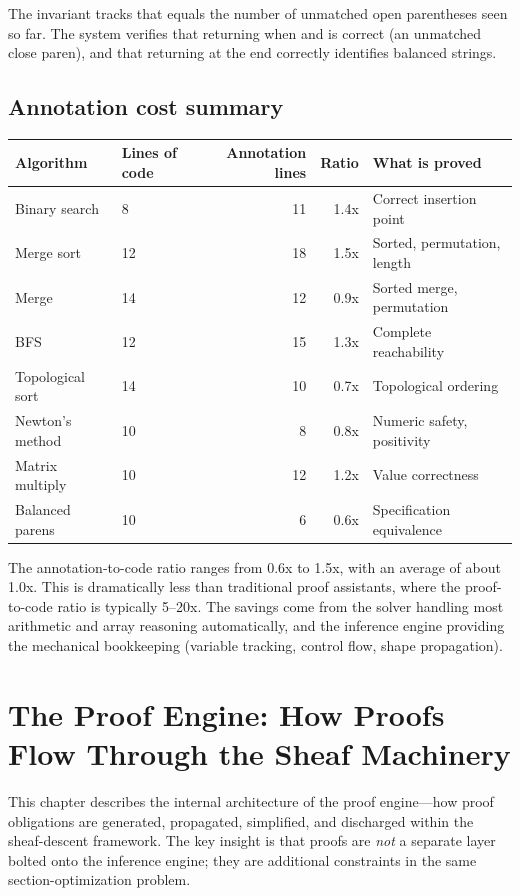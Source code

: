 \documentclass[11pt]{report}
\DeclareRobustCommand{\py}[1]{\texttt{\detokenize{#1}}}
\theoremstyle{definition}
\theoremstyle{plain}
\begin{document}
The invariant tracks that \py{depth} equals the number of unmatched open
parentheses seen so far. The system verifies that returning \py{False} when
\py{depth == 0} and \py{ch == ')'} is correct (an unmatched close paren),
and that returning \py{depth == 0} at the end correctly identifies balanced
strings.

\section{Annotation cost summary}

\begin{center}
\begin{tabular}{llrrp{4cm}}
\toprule
\textbf{Algorithm} & \textbf{Lines of code} & \textbf{Annotation lines} &
  \textbf{Ratio} & \textbf{What is proved} \\
\midrule
Binary search & 8 & 11 & 1.4x & Correct insertion point \\
Merge sort & 12 & 18 & 1.5x & Sorted, permutation, length \\
Merge & 14 & 12 & 0.9x & Sorted merge, permutation \\
BFS & 12 & 15 & 1.3x & Complete reachability \\
Topological sort & 14 & 10 & 0.7x & Topological ordering \\
Newton's method & 10 & 8 & 0.8x & Numeric safety, positivity \\
Matrix multiply & 10 & 12 & 1.2x & Value correctness \\
Balanced parens & 10 & 6 & 0.6x & Specification equivalence \\
\bottomrule
\end{tabular}
\end{center}

The annotation-to-code ratio ranges from 0.6x to 1.5x, with an average of
about 1.0x. This is dramatically less than traditional proof assistants, where
the proof-to-code ratio is typically 5--20x. The savings come from the solver
handling most arithmetic and array reasoning automatically, and the inference
engine providing the mechanical bookkeeping (variable tracking, control flow,
shape propagation).

\chapter{The Proof Engine: How Proofs Flow Through the Sheaf Machinery}

This chapter describes the internal architecture of the proof engine---how
proof obligations are generated, propagated, simplified, and discharged
within the sheaf-descent framework. The key insight is that proofs are
\emph{not} a separate layer bolted onto the inference engine; they are
additional constraints in the same section-optimization problem.
\end{document}
